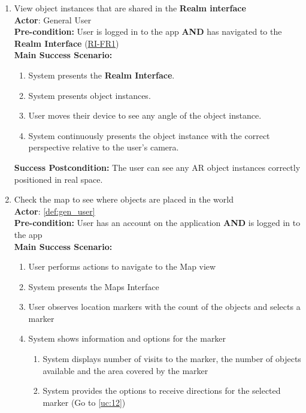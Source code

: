 \documentclass{article}
\begin{document}
\begin{enumerate}[label=\textbf{UC\arabic*}]
    \item \label{uc:10} View object instances that are shared in the \textbf{Realm interface} \\
          \textbf{Actor}: General User \\
          \textbf{Pre-condition:} User is logged in to the app \textbf{AND} has navigated to the \textbf{Realm Interface} (\hyperref[ssub:realm_interface]{RI-FR1}) \\

          \textbf{Main Success Scenario:}
          \begin{enumerate}[label=\textbf{\arabic*.}]
              \item System presents the \textbf{Realm Interface}.
              \item System  presents object instances.
              \item User moves their device to see any angle of the object instance.
              \item System continuously presents the object instance with the correct perspective relative to the user’s camera.
          \end{enumerate}
          
          \textbf{Success Postcondition:} The user can see any AR object instances correctly positioned in real space.

    \item \label{uc:11} Check the map to see where objects are placed in the world \\
          \textbf{Actor}: \ref{def:gen_user} \\
          \textbf{Pre-condition:} User has an account on the application \textbf{AND} is logged in to the app \\

          \textbf{Main Success Scenario:}
          \begin{enumerate}[label=\textbf{\arabic*.}]
              \item User performs actions to navigate to the Map view
              \item System presents the Maps Interface
              \item User observes location markers with the count of the objects and selects a marker
              \item System shows information and options for the marker
                    \begin{enumerate}[label=(\alph*)]
                        \item System displays number of visits to the marker, the number of objects available and the area covered by the marker
                        \item System provides the options to receive directions for the selected marker (Go to \ref{uc:12})
                    \end{enumerate}
          \end{enumerate}


\end{enumerate}
\end{document}
